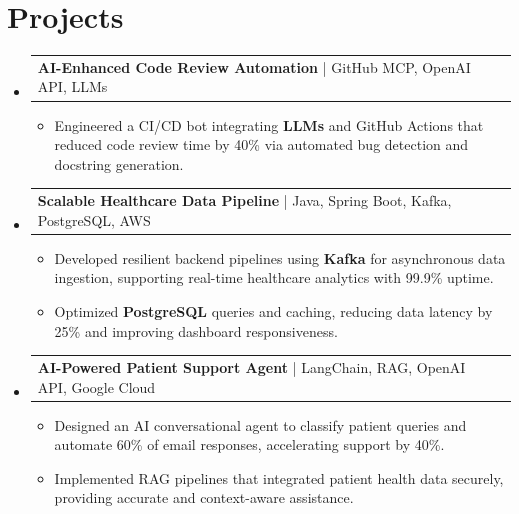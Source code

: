 \documentclass[letterpaper,11pt]{article}
\makeatletter
\newcommand{\resumeItem}[1]{
  \item\footnotesize{
    {#1 \vspace{-2pt}}
  }
}
\newcommand{\resumeProjectHeading}[2]{
    \item
    \begin{tabular*}{1.001\textwidth}{l@{\extracolsep{\fill}}r}
      \small#1 & \textbf{\small #2}\\
    \end{tabular*}\vspace{-7pt}
}
\newcommand{\resumeSubHeadingListStart}{\begin{itemize}[leftmargin=0pt, label={}]}
\newcommand{\resumeSubHeadingListEnd}{\end{itemize}}
\newcommand{\resumeItemListStart}{\begin{itemize}[leftmargin=*]}
\newcommand{\resumeItemListEnd}{\end{itemize}\vspace{-5pt}}
\makeatother
\begin{document}
\section{Projects}
    \vspace{-5pt}
    \resumeSubHeadingListStart
          \resumeProjectHeading
              {\textbf{AI-Enhanced Code Review Automation} | GitHub MCP, OpenAI API, LLMs}{}
        \resumeItemListStart
            \resumeItem{Engineered a CI/CD bot integrating \textbf{LLMs} and GitHub Actions that reduced code review time by 40\% via automated bug detection and docstring generation.}
        \resumeItemListEnd
        \vspace{-12pt}
    
    \resumeProjectHeading
        {\textbf{Scalable Healthcare Data Pipeline} | Java, Spring Boot, Kafka, PostgreSQL, AWS}{}
        \resumeItemListStart
            \resumeItem{Developed resilient backend pipelines using \textbf{Kafka} for asynchronous data ingestion, supporting real-time healthcare analytics with 99.9\% uptime.}
            \resumeItem{Optimized \textbf{PostgreSQL} queries and caching, reducing data latency by 25\% and improving dashboard responsiveness.}
        \resumeItemListEnd
          \vspace{-12pt}
      \resumeProjectHeading
          {\textbf{AI-Powered Patient Support Agent} | LangChain, RAG, OpenAI API, Google Cloud}{}
          \resumeItemListStart
              \resumeItem{Designed an AI conversational agent to classify patient queries and automate 60\% of email responses, accelerating support by 40\%.}
              \resumeItem{Implemented RAG pipelines that integrated patient health data securely, providing accurate and context-aware assistance.}
          \resumeItemListEnd 
    \resumeSubHeadingListEnd
\end{document}
